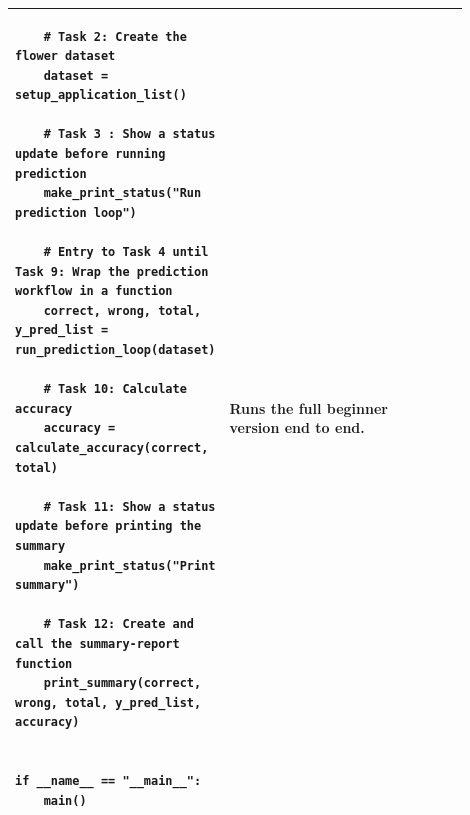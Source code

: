 \begin{landscape}
\begin{longtable}{|p{0.28\linewidth}|p{0.48\linewidth}|p{0.14\linewidth}|}
\begin{verbatim}
    # Task 2: Create the flower dataset
    dataset = setup_application_list()

    # Task 3 : Show a status update before running prediction
    make_print_status("Run prediction loop")

    # Entry to Task 4 until Task 9: Wrap the prediction workflow in a function
    correct, wrong, total, y_pred_list = run_prediction_loop(dataset)

    # Task 10: Calculate accuracy
    accuracy = calculate_accuracy(correct, total)

    # Task 11: Show a status update before printing the summary
    make_print_status("Print summary")

    # Task 12: Create and call the summary-report function
    print_summary(correct, wrong, total, y_pred_list, accuracy)


if __name__ == "__main__":
    main()
\end{verbatim}
& Runs the full beginner version end to end. \\
\hline
\end{longtable}
\end{landscape}
